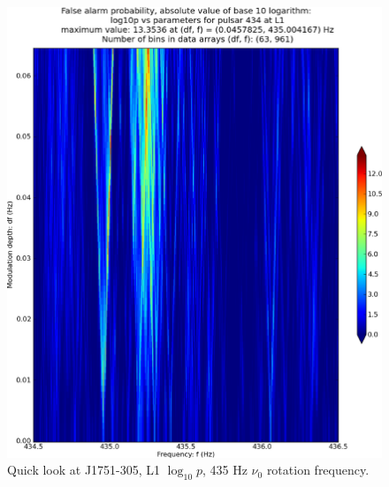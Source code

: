 \begin{figure}
\begin{center}
\includegraphics[width=0.68\paperwidth,height=0.48\paperheight]{plots/DFvsFresultsProb-L1_pulsar-434.eps}
\caption{
Quick look at J1751-305, L1 $\log_{10}p$, 435 Hz $\nu_0$ rotation frequency.}
\end{center}
\end{figure}


